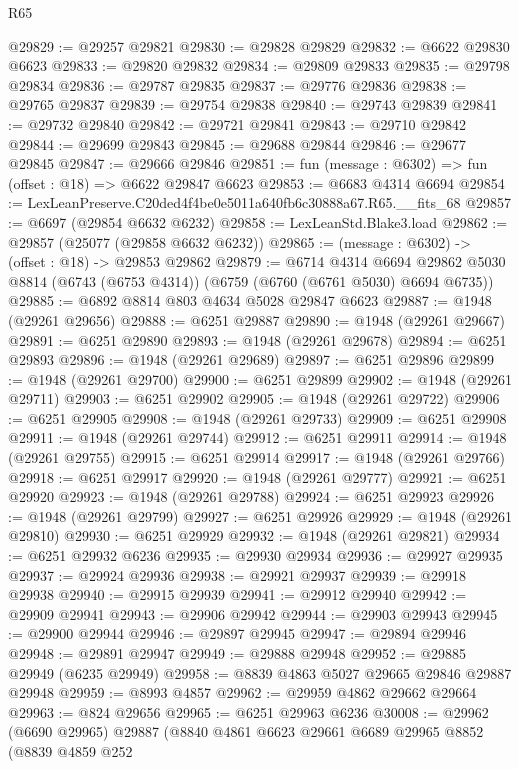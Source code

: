 \begin{lexlean}{R65}
\begin{coremodule}
{@29829 := @29257 @29821
@29830 := @29828 @29829
@29832 := @6622 @29830 @6623
@29833 := @29820 @29832
@29834 := @29809 @29833
@29835 := @29798 @29834
@29836 := @29787 @29835
@29837 := @29776 @29836
@29838 := @29765 @29837
@29839 := @29754 @29838
@29840 := @29743 @29839
@29841 := @29732 @29840
@29842 := @29721 @29841
@29843 := @29710 @29842
@29844 := @29699 @29843
@29845 := @29688 @29844
@29846 := @29677 @29845
@29847 := @29666 @29846
@29851 := fun (message : @6302) => fun (offset : @18) => @6622 @29847 @6623
@29853 := @6683 @4314 @6694
@29854 := LexLeanPreserve.C20ded4f4be0e5011a640fb6c30888a67.R65.__fits_68
@29857 := @6697 (@29854 @6632 @6232)
@29858 := LexLeanStd.Blake3.load
@29862 := @29857 (@25077 (@29858 @6632 @6232))
@29865 := (message : @6302) -> (offset : @18) -> @29853 @29862
@29879 := @6714
    @4314
    @6694
    @29862
    @5030
    @8814
    (@6743 (@6753 @4314))
    (@6759 (@6760 (@6761 @5030) @6694 @6735))
@29885 := @6892 @8814 @803 @4634 @5028 @29847 @6623
@29887 := @1948 (@29261 @29656)
@29888 := @6251 @29887
@29890 := @1948 (@29261 @29667)
@29891 := @6251 @29890
@29893 := @1948 (@29261 @29678)
@29894 := @6251 @29893
@29896 := @1948 (@29261 @29689)
@29897 := @6251 @29896
@29899 := @1948 (@29261 @29700)
@29900 := @6251 @29899
@29902 := @1948 (@29261 @29711)
@29903 := @6251 @29902
@29905 := @1948 (@29261 @29722)
@29906 := @6251 @29905
@29908 := @1948 (@29261 @29733)
@29909 := @6251 @29908
@29911 := @1948 (@29261 @29744)
@29912 := @6251 @29911
@29914 := @1948 (@29261 @29755)
@29915 := @6251 @29914
@29917 := @1948 (@29261 @29766)
@29918 := @6251 @29917
@29920 := @1948 (@29261 @29777)
@29921 := @6251 @29920
@29923 := @1948 (@29261 @29788)
@29924 := @6251 @29923
@29926 := @1948 (@29261 @29799)
@29927 := @6251 @29926
@29929 := @1948 (@29261 @29810)
@29930 := @6251 @29929
@29932 := @1948 (@29261 @29821)
@29934 := @6251 @29932 @6236
@29935 := @29930 @29934
@29936 := @29927 @29935
@29937 := @29924 @29936
@29938 := @29921 @29937
@29939 := @29918 @29938
@29940 := @29915 @29939
@29941 := @29912 @29940
@29942 := @29909 @29941
@29943 := @29906 @29942
@29944 := @29903 @29943
@29945 := @29900 @29944
@29946 := @29897 @29945
@29947 := @29894 @29946
@29948 := @29891 @29947
@29949 := @29888 @29948
@29952 := @29885 @29949 (@6235 @29949)
@29958 := @8839 @4863 @5027 @29665 @29846 @29887 @29948
@29959 := @8993 @4857
@29962 := @29959 @4862 @29662 @29664
@29963 := @824 @29656
@29965 := @6251 @29963 @6236
@30008 := @29962
    (@6690 @29965)
    @29887
    (@8840
      @4861
      @6623
      @29661
      @6689
      @29965
      @8852
      (@8839
        @4859
        @252
}
\end{coremodule}
\end{lexlean}
